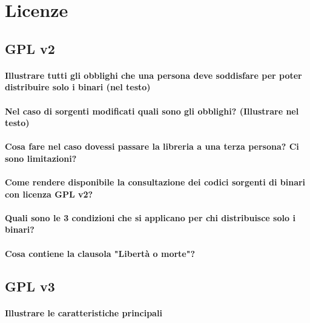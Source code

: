 \documentclass[a4paper]{article}
\begin{document}
		
	\section{Licenze}
	
		\subsection{GPL v2}
		
			\paragraph{Illustrare tutti gli obblighi che una persona deve soddisfare per poter distribuire solo i binari (nel testo)}
			
		
			\paragraph{Nel caso di sorgenti modificati quali sono gli obblighi? (Illustrare nel testo)}
		
			\paragraph{Cosa fare nel caso dovessi passare la libreria a una terza persona? Ci sono limitazioni?}
			
			\paragraph{Come rendere disponibile la consultazione dei codici sorgenti di binari con licenza GPL v2?} %
			
			\paragraph{Quali sono le 3 condizioni che si applicano per chi distribuisce solo i binari?}
			
			\paragraph{Cosa contiene la clausola "Libertà o morte"?}
		
		\subsection{GPL v3}
			
			\paragraph{Illustrare le caratteristiche principali}
		
\end{document}
